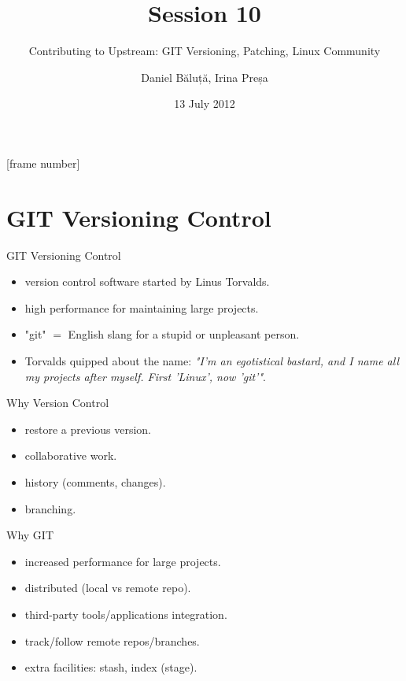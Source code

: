 \documentclass{workshop}
\title[Sesssion 10]{Session 10}
\subtitle{Contributing to Upstream: GIT Versioning, Patching, Linux Community}
\author{Daniel Băluță, Irina Preșa}
\date{13 July 2012}
\begin{document}
[frame number]

\frame{\titlepage}

\section{GIT Versioning Control}

\begin{frame}{GIT Versioning Control}
\begin{itemize}
\item version control software started by Linus Torvalds.
\item high performance for maintaining large projects.
\item<2> "git" $=$ English slang for a stupid or unpleasant person.
\item<2> Torvalds quipped about the name: \emph{"I'm an egotistical bastard, and I
name all my projects after myself. First 'Linux', now 'git'"}.
\end{itemize}
\end{frame}

\begin{frame}{Why Version Control}
\begin{itemize}
\item restore a previous version.
\item collaborative work.
\item history (comments, changes).
\item branching.
\end{itemize}
\end{frame}

\begin{frame}{Why GIT}
\begin{itemize}
\item increased performance for large projects.
\item distributed (local vs remote repo).
\item third-party tools/applications integration.
\item track/follow remote repos/branches.
\item extra facilities: stash, index (stage).
\end{itemize}
\end{frame}
\end{document}
